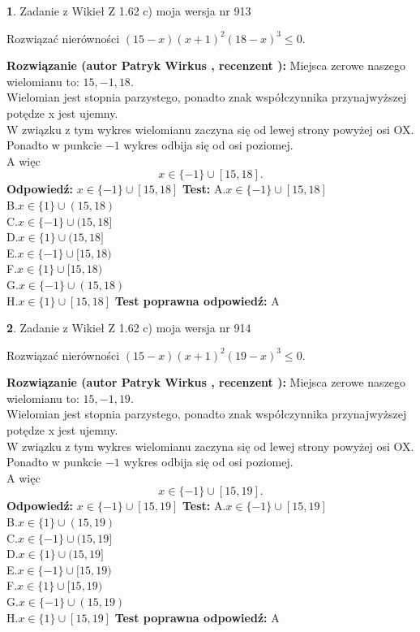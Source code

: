 \documentclass[12pt, a4paper]{article}
\theoremstyle{definition} %
\newtheorem{zad}{}
\newcommand{\zadStart}[1]{\begin{zad}#1\newline}
\newcommand{\zadStop}{\end{zad}}
\newcommand{\rozwStart}[2]{\noindent \textbf{Rozwiązanie (autor #1 , recenzent #2): }\newline}
\newcommand{\rozwStop}{\newline}
\newcommand{\odpStart}{\noindent \textbf{Odpowiedź:}\newline}
\newcommand{\odpStop}{\newline}
\newcommand{\testStart}{\noindent \textbf{Test:}\newline}
\newcommand{\testStop}{\newline}
\newcommand{\kluczStart}{\noindent \textbf{Test poprawna odpowiedź:}\newline}
\newcommand{\kluczStop}{\newline}
\begin{document}
\zadStart{Zadanie z Wikieł Z 1.62 c) moja wersja nr 913}

Rozwiązać nierówności $(15-x)(x+1)^{2}(18-x)^{3}\le0$.
\zadStop
\rozwStart{Patryk Wirkus}{}
Miejsca zerowe naszego wielomianu to: $15, -1, 18$.\\
Wielomian jest stopnia parzystego, ponadto znak współczynnika przy\linebreak najwyższej potędze x jest ujemny.\\ W związku z tym wykres wielomianu zaczyna się od lewej strony powyżej osi OX.\\
Ponadto w punkcie $-1$ wykres odbija się od osi poziomej.\\
A więc $$x \in \{-1\} \cup [15,18].$$
\rozwStop
\odpStart
$x \in \{-1\} \cup [15,18]$
\odpStop
\testStart
A.$x \in \{-1\} \cup [15,18]$\\
B.$x \in \{1\} \cup (15,18)$\\
C.$x \in \{-1\} \cup (15,18]$\\
D.$x \in \{1\} \cup (15,18]$\\
E.$x \in \{-1\} \cup [15,18)$\\
F.$x \in \{1\} \cup [15,18)$\\
G.$x \in \{-1\} \cup (15,18)$\\
H.$x \in \{1\} \cup [15,18]$
\testStop
\kluczStart
A
\kluczStop



\zadStart{Zadanie z Wikieł Z 1.62 c) moja wersja nr 914}

Rozwiązać nierówności $(15-x)(x+1)^{2}(19-x)^{3}\le0$.
\zadStop
\rozwStart{Patryk Wirkus}{}
Miejsca zerowe naszego wielomianu to: $15, -1, 19$.\\
Wielomian jest stopnia parzystego, ponadto znak współczynnika przy\linebreak najwyższej potędze x jest ujemny.\\ W związku z tym wykres wielomianu zaczyna się od lewej strony powyżej osi OX.\\
Ponadto w punkcie $-1$ wykres odbija się od osi poziomej.\\
A więc $$x \in \{-1\} \cup [15,19].$$
\rozwStop
\odpStart
$x \in \{-1\} \cup [15,19]$
\odpStop
\testStart
A.$x \in \{-1\} \cup [15,19]$\\
B.$x \in \{1\} \cup (15,19)$\\
C.$x \in \{-1\} \cup (15,19]$\\
D.$x \in \{1\} \cup (15,19]$\\
E.$x \in \{-1\} \cup [15,19)$\\
F.$x \in \{1\} \cup [15,19)$\\
G.$x \in \{-1\} \cup (15,19)$\\
H.$x \in \{1\} \cup [15,19]$
\testStop
\kluczStart
A
\kluczStop
\end{document}
